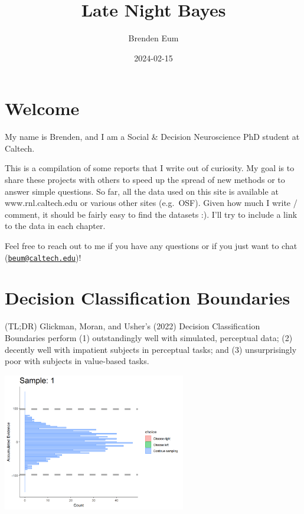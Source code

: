 \documentclass[
]{book}
\title{Late Night Bayes}
\author{Brenden Eum}
\date{2024-02-15}
\begin{document}
\maketitle

{
\setcounter{tocdepth}{1}
\tableofcontents
}
\hypertarget{welcome}{%
\chapter{Welcome}\label{welcome}}

My name is Brenden, and I am a Social \& Decision Neuroscience PhD student at Caltech.

This is a compilation of some reports that I write out of curiosity. My goal is to share these projects with others to speed up the spread of new methods or to answer simple questions. So far, all the data used on this site is available at www.rnl.caltech.edu or various other sites (e.g.~OSF). Given how much I write / comment, it should be fairly easy to find the datasets :). I'll try to include a link to the data in each chapter.

Feel free to reach out to me if you have any questions or if you just want to chat (\href{mailto:beum@caltech.edu}{\nolinkurl{beum@caltech.edu}})!

\hypertarget{dcb}{%
\chapter{Decision Classification Boundaries}\label{dcb}}

(TL;DR) Glickman, Moran, and Usher's (2022) Decision Classification Boundaries perform (1) outstandingly well with simulated, perceptual data; (2) decently well with impatient subjects in perceptual tasks; and (3) unsurprisingly poor with subjects in value-based tasks.

\includegraphics[width=0.6\textwidth,height=\textheight]{images/dcb-collapsingbounds.gif}
\end{document}
